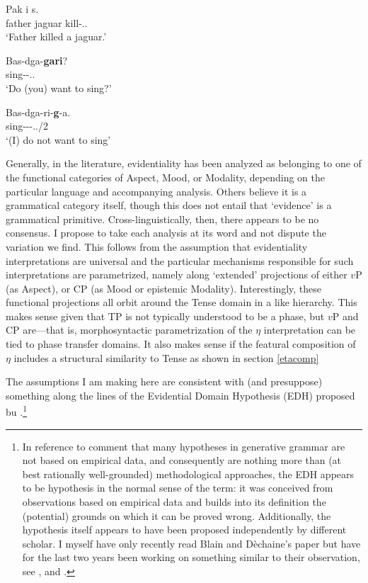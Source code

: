 \documentclass{article}
\begin{document}
 \begin{exe}
\ex 
\gll Pak i  s. \\
	    father jaguar  kill-\evd.\Scnd.\m\sg \\
\glt `Father killed a jaguar.' 

\ex
\gll Bas-dga-{\bf gari}?\\
     sing-\Des-\Q.\Nvis.\prs\\
\glt `Do (you) want to sing?'

\ex
\gll Bas-dga-ri-{\bf g}-a.\\
     sing-\Des-\Neg-\evd.\Nvis./2\\
\glt `(I) do not want to sing'
\end{exe}

Generally, in the literature, evidentiality has been analyzed as belonging to one of the functional categories of Aspect, Mood, or Modality, depending on the particular language and accompanying analysis. Others believe it is a grammatical category itself, though this does not entail that `evidence' is a grammatical primitive. Cross-linguistically, then, there appears to be no consensus. I propose to take each analysis at its word and not dispute the variation we find. This follows from the assumption that evidentiality interpretations are universal and the particular mechanisms responsible for such interpretations are parametrized, namely along `extended' projections of either $v$P (as Aspect), or CP (as Mood or epistemic Modality). Interestingly, these functional projections all orbit around the Tense domain in a \cite{cinque99adverbs} like hierarchy. This makes sense given that TP is not typically understood to be a phase, but $v$P and CP are---that is, morphosyntactic parametrization of the $\eta$ interpretation can be tied to phase transfer domains. It also makes sense if the featural composition of $\eta$ includes a structural similarity to Tense as shown in section \ref{etacomp}

The assumptions I am making here are consistent with (and presuppose) something along the lines of the Evidential Domain Hypothesis (EDH) proposed bu \cite{blaindechaine07evdtypes}.\footnote{In reference to  comment that many hypotheses in generative grammar are not based on empirical data, and consequently are nothing more than (at best rationally well-grounded) methodological approaches, the EDH appears to be hypothesis in the normal sense of the term: it was conceived from observations based on empirical data and builds into its definition the (potential) grounds on which it can be proved wrong. Additionally, the hypothesis itself appears to have been proposed independently by different scholar. I myself have only recently read Blain and D\`echaine's paper but have for the last two years been working on something similar to their observation, see \cite{bowles07phieta},  and .}
\end{document}
